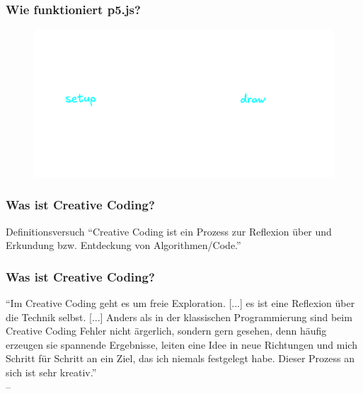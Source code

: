 \documentclass[aspectratio=169]{beamer}
\begin{document}
\begin{frame}
	\frametitle{Wie funktioniert p5.js?}
    \begin{figure}
    \includegraphics[width=\textwidth]{./figs/p5-draw-cycle.png}
    \end{figure}
\end{frame}

\begin{frame}
	\frametitle{Was ist Creative Coding?}
	\begin{block}{Definitionsversuch}
	\enquote{Creative Coding ist ein \alert{Prozess} zur \alert{Reflexion} über und \alert{Erkundung} bzw. \alert{Entdeckung} von \alert{Algorithmen}/Code.}
	\end{block}
\end{frame}

\begin{frame}
	\frametitle{Was ist Creative Coding?}
\begin{center}
	\enquote{Im \alert{Creative Coding} geht es um \alert{freie Exploration}. [...] es ist eine \alert{Reflexion über die Technik} selbst. [...] Anders als in der klassischen Programmierung sind beim Creative Coding Fehler nicht ärgerlich, sondern gern gesehen, denn häufig erzeugen sie spannende Ergebnisse, leiten eine Idee in neue Richtungen und mich Schritt für Schritt an ein Ziel, das ich niemals festgelegt habe. Dieser Prozess an sich ist sehr kreativ.}\\-- \cite{huebner:2023}
	\end{center}
\end{frame}
\end{document}
